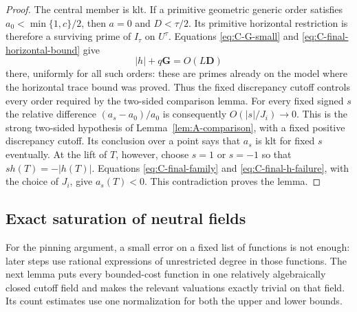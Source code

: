 \begin{proof}
The central member is klt.  If a primitive geometric generic order
satisfies
$a_0<\min\{1,c\}/2$, then $a=0$ and $D<\tau/2$.
Its primitive horizontal restriction is therefore a surviving prime
of $I_\tau$ on $U^\tau$.  Equations
\eqref{eq:C-G-small} and \eqref{eq:C-final-horizontal-bound} give
\[
                        |h|+q\mathbf G=O(L\mathbf D)
\]
there, uniformly for all such orders: these are primes already on the
model where the horizontal trace bound was proved.  Thus the fixed
discrepancy cutoff controls every order required by the two-sided
comparison lemma.  For every fixed signed $s$ the
relative difference $(a_s-a_0)/a_0$ is consequently $O(|s|/J_i)\to0$.
This is the strong two-sided hypothesis of
Lemma~\ref{lem:A-comparison}, with a fixed positive discrepancy
cutoff.  Its conclusion over a point says that $a_s$ is klt for fixed
$s$ eventually.  At the lift of $T$, however, choose $s=1$ or $s=-1$
so that $sh(T)=-|h(T)|$.  Equations
\eqref{eq:C-final-family} and \eqref{eq:C-final-h-failure}, with the
choice of $J_i$, give $a_s(T)<0$.  This contradiction proves the lemma.
\end{proof}

\subsection{Exact saturation of neutral fields}

For the pinning argument, a small error on a fixed list of functions is
not enough: later steps use rational expressions of unrestricted degree
in those functions.  The next lemma puts every bounded-cost function in
one relatively algebraically closed cutoff field and makes the relevant
valuations exactly trivial on that field.  Its count estimates use one
normalization for both the upper and lower bounds.
\label{subsec:C-saturation}

